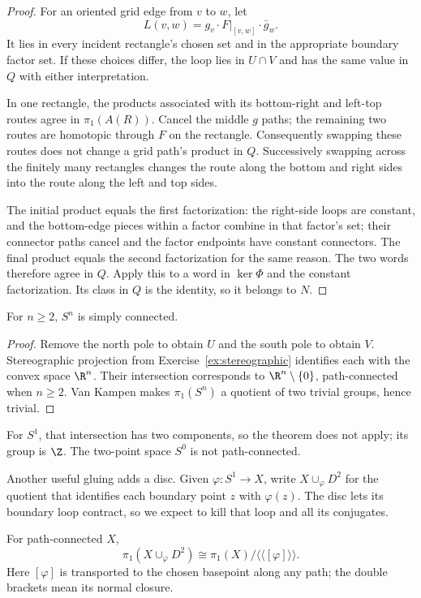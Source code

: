 \begin{proof}
For an oriented grid edge from $v$ to $w$, let
\[
L(v,w)=g_v\cdot F|_{[v,w]}\cdot\bar g_w.
\]
It lies in every incident rectangle's chosen set and in the appropriate boundary factor set. If these choices differ, the loop lies in $U\cap V$ and has the same value in $Q$ with either interpretation.

In one rectangle, the products associated with its bottom-right and left-top routes agree in $\pi_1(A(R))$. Cancel the middle $g$ paths; the remaining two routes are homotopic through $F$ on the rectangle. Consequently swapping these routes does not change a grid path's product in $Q$. Successively swapping across the finitely many rectangles changes the route along the bottom and right sides into the route along the left and top sides.

The initial product equals the first factorization: the right-side loops are constant, and the bottom-edge pieces within a factor combine in that factor's set; their connector paths cancel and the factor endpoints have constant connectors. The final product equals the second factorization for the same reason. The two words therefore agree in $Q$. Apply this to a word in $\ker\Phi$ and the constant factorization. Its class in $Q$ is the identity, so it belongs to $N$.
\end{proof}

\begin{corollary}\label{cor:spheres}
For $n\ge2$, $S^n$ is simply connected.
\end{corollary}

\begin{proof}
Remove the north pole to obtain $U$ and the south pole to obtain $V$. Stereographic projection from Exercise~\ref{ex:stereographic} identifies each with the convex space $\R^n$. Their intersection corresponds to $\R^n\setminus\{0\}$, path-connected when $n\ge2$. Van Kampen makes $\pi_1(S^n)$ a quotient of two trivial groups, hence trivial.
\end{proof}

For $S^1$, that intersection has two components, so the theorem does not apply; its group is $\Z$. The two-point space $S^0$ is not path-connected.

Another useful gluing adds a disc. Given $\varphi:S^1\to X$, write $X\cup_\varphi D^2$ for the quotient that identifies each boundary point $z$ with $\varphi(z)$. The disc lets its boundary loop contract, so we expect to kill that loop and all its conjugates.

\begin{proposition}\label{prop:attachdisc}
For path-connected $X$,
\[
\pi_1(X\cup_\varphi D^2)\cong\pi_1(X)/\langle\langle[\varphi]\rangle\rangle.
\]
Here $[\varphi]$ is transported to the chosen basepoint along any path; the double brackets mean its normal closure.
\end{proposition}

